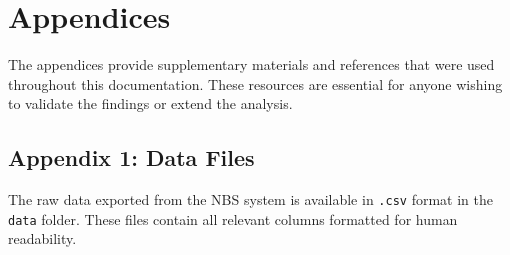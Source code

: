 \newcommand{\FTdir}{}
\def\FTdir(#1,#2,#3){%
  \FTfile(#1,{{\color{black!40!white}\faFolderOpen}\,#3})
  (tmp.west)++(0.8em,-0.4em)node(#2){}
  (tmp.west)++(1.5em,0)
  ++(0,-1.3em) 
}

\newcommand{\FTfile}{}
\def\FTfile(#1,#2){%
  node(tmp){}
  (#1|-tmp)++(0.6em,0)
  node(tmp)[anchor=west,black]{\textbf{\texttt{#2}}}
  (#1)|-(tmp.west)
  ++(0,-1.2em) 
}

\newcommand{\FTroot}{}
\def\FTroot{tmp.west}

\section{Appendices}
\label{sec:Appendices}

The appendices provide supplementary materials and references that were used throughout this documentation. These resources are essential for anyone wishing to validate the findings or extend the analysis.

\subsection{Appendix 1: Data Files}
The raw data exported from the NBS system is available in \texttt{.csv} format in the \texttt{data} folder. These files contain all relevant columns formatted for human readability.

